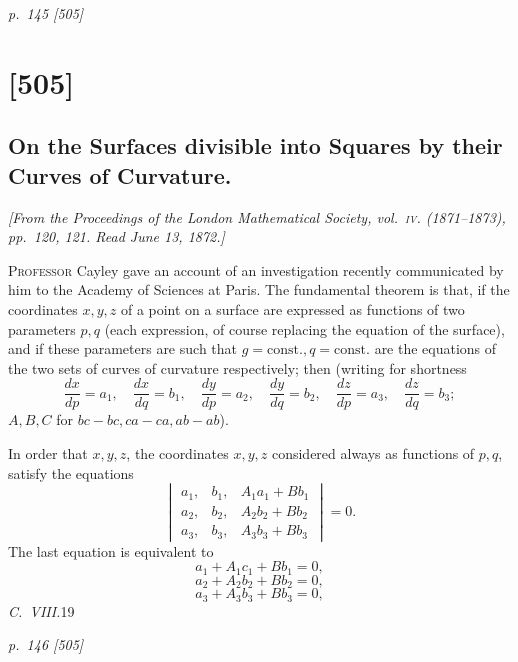 \documentclass[11pt,a4paper]{book}
\begin{document}
\clearpage

\bigskip
\textit{p.~145 [505]}
\smallskip

\section{[505]}
\subsection{On the Surfaces divisible into Squares by their Curves of Curvature.}

\begin{center}
\textit{[From the Proceedings of the London Mathematical Society, vol.~\textsc{iv}. (1871--1873), pp.~120, 121.  Read June 13, 1872.]}
\end{center}

\textsc{Professor} Cayley gave an account of an investigation recently communicated by
him to the Academy of Sciences at Paris. The fundamental theorem is that, if the
coordinates $x, y, z$ of a point on a surface are expressed as functions of two parameters
$p, q$ (each expression, of course replacing the equation of the surface), and if these
parameters are such that $g = \mathrm{const.}, q = \mathrm{const.}$ are the equations of the two sets of
curves of curvature respectively; then (writing for shortness
\[
\frac{dx}{dp} = a_1, \quad \frac{dx}{dq} = b_1, \quad \frac{dy}{dp} = a_2, \quad \frac{dy}{dq} = b_2, \quad \frac{dz}{dp} = a_3, \quad \frac{dz}{dq} = b_3;
\]
$A, B, C$ for $bc - bc, ca - ca, ab - ab$).

In order that $x, y, z$, the coordinates $x, y, z$ considered always as functions of $p, q$,
satisfy the equations
\[
\begin{vmatrix}
a_1, & b_1, & A_1 a_1 + B b_1 \\
a_2, & b_2, & A_2 b_2 + B b_2 \\
a_3, & b_3, & A_3 b_3 + B b_3
\end{vmatrix} = 0.
\]
The last equation is equivalent to
\[
a_1 + A_1 c_1 + B b_1 = 0,
\]
\[
a_2 + A_2 b_2 + B b_2 = 0,
\]
\[
a_3 + A_3 b_3 + B b_3 = 0,
\]
\textit{C.\ VIII.}\hfill 19

\clearpage

\bigskip
\textit{p.~146 [505]}
\smallskip
\end{document}
